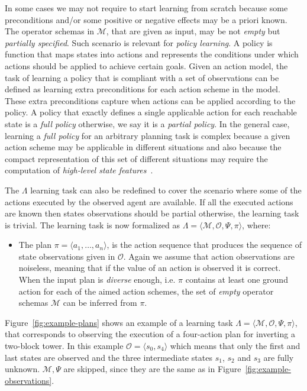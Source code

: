 \documentclass[3p,times]{elsarticle}
\newcommand{\tup}[1]{{\langle #1 \rangle}}
\begin{document}
In some cases we may not require to start learning from scratch because some preconditions and/or some positive or negative effects may be a priori known. The operator schemas in $\mathcal{M}$, that are given as input, may be not {\em empty} but {\em partially specified}. Such scenario is relevant for {\em policy learning}. A policy is function that maps states into actions and represents the conditions under which actions should be applied to achieve certain goals. Given an action model, the task of learning a policy that is compliant with a set of observations can be defined as learning extra preconditions for each action scheme in the model. These extra preconditions capture when actions can be applied according to the policy. A policy that exactly defines a single applicable action for each reachable state is a {\em full policy} otherwise, we say it is a {\em partial policy}. In the general case, learning a {\em full policy} for an arbitrary planning task is complex because a given action scheme may be applicable in different situations and also because the compact representation of this set of different situations may require the computation of {\em high-level state features}~\cite{lotinac2016automatic}.

The $\Lambda$ learning task can also be redefined to cover the scenario where some of the actions executed by the observed agent are available. If all the executed actions are known then states observations should be partial otherwise, the learning task is trivial. The learning task is now formalized as $\Lambda=\tup{\mathcal{M},\mathcal{O},\Psi,\pi}$, where:
\begin{itemize}
\item The plan $\pi=\tup{a_1, \ldots, a_n}$, is the action sequence that produces the sequence of state observations given in $\mathcal{O}$. Again we assume that action observations are noiseless, meaning that if the value of an action is observed it is correct. When the input plan is {\em diverse} enough, i.e. $\pi$ contains at least one ground action for each of the aimed action schemes, the set of {\em empty} operator schemas $\mathcal{M}$ can be inferred from $\pi$.
\end{itemize}

Figure~\ref{fig:example-plans} shows an example of a learning task $\Lambda=\tup{\mathcal{M},\mathcal{O},\Psi,\pi}$, that corresponds to observing the execution of a four-action plan for inverting a two-block tower. In this example $\mathcal{O}=\tup{s_0,s_4}$ which means that only the first and last states are observed and the three intermediate states $s_1$, $s_2$ and $s_3$ are fully unknown. $\mathcal{M},\Psi$ are skipped, since they are the same as in Figure~\ref{fig:example-observations}.
\end{document}
